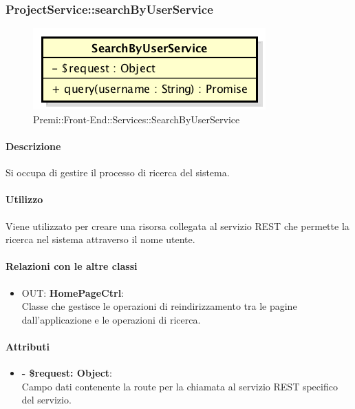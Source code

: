 		
		\subsubsection{ProjectService::searchByUserService}
		\begin{figure}[h]
			\centering
				\includegraphics[width=0.4\linewidth]{img/premi_front_end_services_searchbyuserservice}
			\caption[Premi::Front-End::Services::SearchByUserService]{Premi::Front-End::Services::SearchByUserService}
		\end{figure}
		
		\paragraph{Descrizione}
		Si occupa di gestire il processo di ricerca del sistema.
		
		\paragraph{Utilizzo}
		Viene utilizzato per creare una risorsa collegata al servizio REST che permette la ricerca nel sistema attraverso il nome utente.
		
		\paragraph{Relazioni con le altre classi}
		\begin{itemize}
			\item OUT: \textbf{HomePageCtrl}:\\
			Classe che gestisce le operazioni di reindirizzamento tra le pagine dall'applicazione e le operazioni di ricerca.
		\end{itemize}
		
		\paragraph{Attributi}
		\begin{itemize}
			\item \textbf{- \$request: Object}:\\
			Campo dati contenente la route per la chiamata al servizio REST specifico del servizio.
		\end{itemize}	
		

